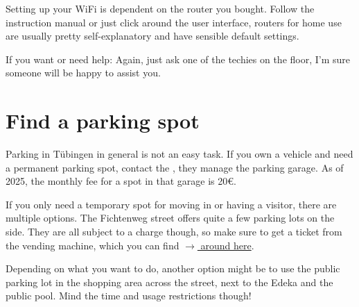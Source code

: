 Setting up your WiFi is dependent on the router you bought. Follow the instruction manual or just click around the user interface, routers for home use are usually pretty self-explanatory and have sensible default settings.

If you want or need help: Again, just ask one of the techies on the floor, I'm sure someone will be happy to assist you.

\section{Find a parking spot}
Parking in Tübingen in general is not an easy task. If you own a vehicle and need a permanent parking spot, contact the , they manage the parking garage. As of 2025, the monthly fee for a spot in that garage is 20€.

If you only need a temporary spot for moving in or having a visitor, there are multiple options. The Fichtenweg street offers quite a few parking lots on the side. They are all subject to a charge though, so make sure to get a ticket from the vending machine, which you can find \href{https://maps.app.goo.gl/Wi5gXiBErb9xiCWt9}{$\xrightarrow{}$ around here}.

Depending on what you want to do, another option might be to use the public parking lot in the shopping area across the street, next to the Edeka and the public pool. Mind the time and usage restrictions though!